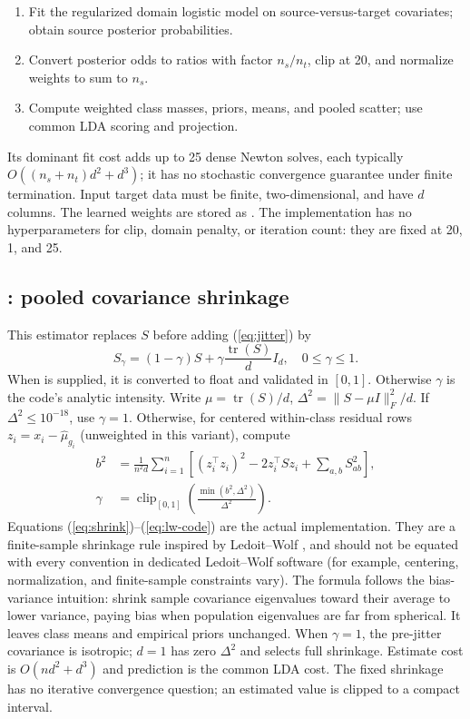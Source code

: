 \documentclass[conference]{IEEEtran}
\begin{document}
\begin{enumerate}
\item Fit the regularized domain logistic model on source-versus-target covariates; obtain source posterior probabilities.
\item Convert posterior odds to ratios with factor \(n_s/n_t\), clip at 20, and normalize weights to sum to \(n_s\).
\item Compute weighted class masses, priors, means, and pooled scatter; use common LDA scoring and projection.
\end{enumerate}
Its dominant fit cost adds up to 25 dense Newton solves, each typically \(O((n_s+n_t)d^2+d^3)\); it has no stochastic convergence guarantee under finite termination. Input target data must be finite, two-dimensional, and have \(d\) columns. The learned weights are stored as . The implementation has no hyperparameters for clip, domain penalty, or iteration count: they are fixed at 20, 1, and 25.

\subsection{: pooled covariance shrinkage}
This estimator replaces \(S\) before adding (\ref{eq:jitter}) by
\begin{equation}
S_\gamma=(1-\gamma)S+\gamma\frac{\operatorname{tr}(S)}{d}I_d,
\quad 0\leq\gamma\leq1.
\label{eq:shrink}
\end{equation}
When  is supplied, it is converted to float and validated in \([0,1]\). Otherwise \(\gamma\) is the code's analytic intensity. Write \(\mu=\operatorname{tr}(S)/d\), \(\Delta^2=\|S-\mu I\|_F^2/d\). If \(\Delta^2\leq10^{-18}\), use \(\gamma=1\). Otherwise, for centered within-class residual rows \(z_i=x_i-\hat\mu_{g_i}\) (unweighted in this variant), compute
\begin{align}
b^2&=\frac{1}{n^2d}\sum_{i=1}^n\left[(z_i^\top z_i)^2-2z_i^\top S z_i+\sum_{a,b}S_{ab}^2\right],\\
\gamma&=\operatorname{clip}_{[0,1]}\left(\frac{\min(b^2,\Delta^2)}{\Delta^2}\right).
\label{eq:lw-code}
\end{align}
Equations (\ref{eq:shrink})--(\ref{eq:lw-code}) are the actual implementation. They are a finite-sample shrinkage rule inspired by Ledoit--Wolf \cite{ledoitwolf2004}, and should not be equated with every convention in dedicated Ledoit--Wolf software (for example, centering, normalization, and finite-sample constraints vary). The formula follows the bias-variance intuition: shrink sample covariance eigenvalues toward their average to lower variance, paying bias when population eigenvalues are far from spherical. It leaves class means and empirical priors unchanged. When \(\gamma=1\), the pre-jitter covariance is isotropic; \(d=1\) has zero \(\Delta^2\) and selects full shrinkage. Estimate cost is \(O(nd^2+d^3)\) and prediction is the common LDA cost. The fixed shrinkage has no iterative convergence question; an estimated value is clipped to a compact interval.
\end{document}
